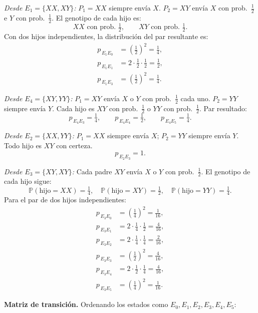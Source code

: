 \documentclass[10pt,a4paper]{article}
\newcommand{\Prob}[1]{\mathbb{P}\!\left(#1\right)}
\newcommand{\pij}[2]{p_{\,#1#2}}
\begin{document}
\noindent\textit{Desde $E_1 = \{XX,XY\}$:}\quad
$P_1 = XX$ siempre env\'ia $X$. $P_2 = XY$ env\'ia $X$ con prob.\ $\tfrac{1}{2}$ e
$Y$ con prob.\ $\tfrac{1}{2}$. El genotipo de cada hijo es:
\[
  XX \text{ con prob.\ } \tfrac{1}{2},\qquad XY \text{ con prob.\ } \tfrac{1}{2}.
\]
Con dos hijos independientes, la distribuci\'on del par resultante es:
\begin{align*}
  \pij{E_1}{E_0} & = \left(\tfrac{1}{2}\right)^2 = \tfrac{1}{4},         \\
  \pij{E_1}{E_1} & = 2\cdot\tfrac{1}{2}\cdot\tfrac{1}{2} = \tfrac{1}{2}, \\
  \pij{E_1}{E_3} & = \left(\tfrac{1}{2}\right)^2 = \tfrac{1}{4}.
\end{align*}

\noindent\textit{Desde $E_4 = \{XY,YY\}$:}\quad
$P_1 = XY$ env\'ia $X$ o $Y$ con prob.\ $\tfrac{1}{2}$ cada uno. $P_2 = YY$ siempre
env\'ia $Y$. Cada hijo es $XY$ con prob.\ $\tfrac{1}{2}$ o $YY$ con prob.\ $\tfrac{1}{2}$.
Par resultado:
\[
  \pij{E_4}{E_3} = \tfrac{1}{4},\qquad \pij{E_4}{E_4} = \tfrac{1}{2},\qquad
  \pij{E_4}{E_5} = \tfrac{1}{4}.
\]

\noindent\textit{Desde $E_2 = \{XX,YY\}$:}\quad
$P_1 = XX$ siempre env\'ia $X$; $P_2 = YY$ siempre env\'ia $Y$. Todo hijo es
$XY$ con certeza.
\[
  \pij{E_2}{E_3} = 1.
\]

\noindent\textit{Desde $E_3 = \{XY,XY\}$:}\quad
Cada padre $XY$ env\'ia $X$ o $Y$ con prob.\ $\tfrac{1}{2}$. El genotipo de cada
hijo sigue:
\[
  \Prob{\text{hijo}=XX} = \tfrac{1}{4},\quad
  \Prob{\text{hijo}=XY} = \tfrac{1}{2},\quad
  \Prob{\text{hijo}=YY} = \tfrac{1}{4}.
\]
Para el par de dos hijos independientes:
\begin{align*}
  \pij{E_3}{E_0} & = \left(\tfrac{1}{4}\right)^2 = \tfrac{1}{16},         \\[2pt]
  \pij{E_3}{E_1} & = 2\cdot\tfrac{1}{4}\cdot\tfrac{1}{2} = \tfrac{4}{16}, \\[2pt]
  \pij{E_3}{E_2} & = 2\cdot\tfrac{1}{4}\cdot\tfrac{1}{4} = \tfrac{2}{16}, \\[2pt]
  \pij{E_3}{E_3} & = \left(\tfrac{1}{2}\right)^2 = \tfrac{4}{16},         \\[2pt]
  \pij{E_3}{E_4} & = 2\cdot\tfrac{1}{2}\cdot\tfrac{1}{4} = \tfrac{4}{16}, \\[2pt]
  \pij{E_3}{E_5} & = \left(\tfrac{1}{4}\right)^2 = \tfrac{1}{16}.
\end{align*}

\medskip
\textbf{Matriz de transici\'on.}\quad
Ordenando los estados como $E_0,E_1,E_2,E_3,E_4,E_5$:
\end{document}
